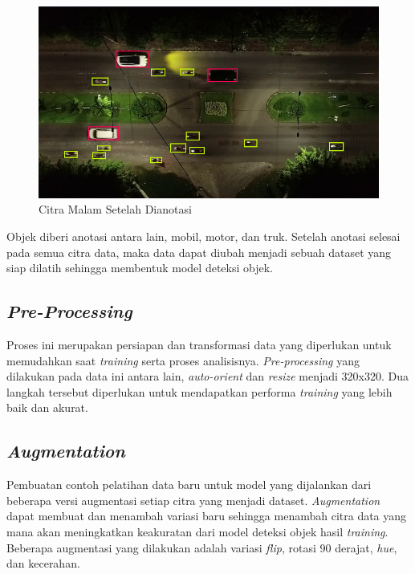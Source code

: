 \begin{figure} [H] \centering
  \includegraphics[scale=0.5]{bab3/anotasidatamalam.png}
  \caption{Citra Malam Setelah Dianotasi}
  \label{fig:anotasidatamalam}
\end{figure}

Objek diberi anotasi antara lain, mobil, motor, dan truk. Setelah anotasi selesai pada semua citra data, maka data dapat diubah menjadi sebuah dataset yang siap dilatih sehingga membentuk model deteksi objek.

\subsection{\emph{Pre-Processing}}
Proses ini merupakan persiapan dan transformasi data yang diperlukan untuk memudahkan saat \emph{training} serta proses analisisnya. \emph{Pre-processing} yang dilakukan pada data ini antara lain, \emph{auto-orient} dan \emph{resize} menjadi 320x320. Dua langkah tersebut diperlukan untuk mendapatkan performa \emph{training} yang lebih baik dan akurat.

\subsection{\emph{Augmentation}}
Pembuatan contoh pelatihan data baru untuk model yang dijalankan dari beberapa versi augmentasi setiap citra yang menjadi dataset. \emph{Augmentation} dapat membuat dan menambah variasi baru sehingga menambah citra data yang mana akan meningkatkan keakuratan dari model deteksi objek hasil \emph{training}. Beberapa augmentasi yang dilakukan adalah variasi \emph{flip}, rotasi 90 derajat, \emph{hue}, dan kecerahan.

